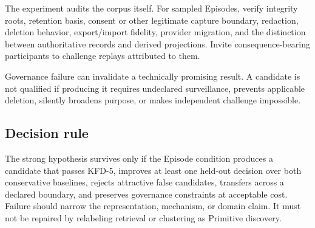 The experiment audits the corpus itself. For sampled Episodes, verify integrity
roots, retention basis, consent or other legitimate capture boundary,
redaction, deletion behavior, export/import fidelity, provider migration, and
the distinction between authoritative records and derived projections. Invite
consequence-bearing participants to challenge replays attributed to them.

Governance failure can invalidate a technically promising result. A candidate
is not qualified if producing it requires undeclared surveillance, prevents
applicable deletion, silently broadens purpose, or makes independent challenge
impossible.

\subsection{Decision rule}

The strong hypothesis survives only if the Episode condition produces a
candidate that passes KFD-5, improves at least one held-out decision over both
conservative baselines, rejects attractive false candidates, transfers across
a declared boundary, and preserves governance constraints at acceptable cost.
Failure should narrow the representation, mechanism, or domain claim. It must
not be repaired by relabeling retrieval or clustering as Primitive discovery.
